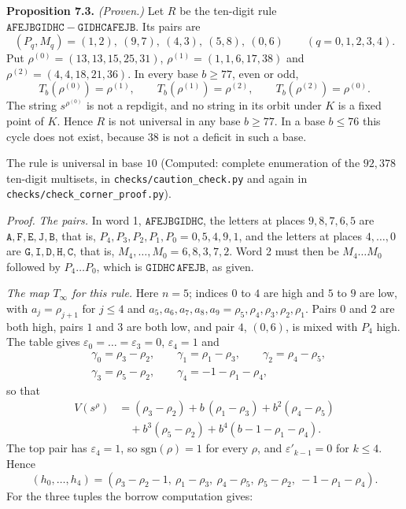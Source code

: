 \documentclass[11pt,letterpaper]{article}
\theoremstyle{paperstyle}
\theoremstyle{paperstyledef}
\theoremstyle{paperstylerem}
\begin{document}
\textbf{Proposition 7.3.} \emph{(Proven.)} Let \(R\) be the ten-digit rule \(\mathtt{AFEJBGIDHC} - \mathtt{GIDHCAFEJB}\). Its pairs are \[(P_q, M_q) = (1,2),\ (9,7),\ (4,3),\ (5,8),\ (0,6) \qquad (q = 0, 1, 2, 3, 4).\] Put \(\rho^{(0)} = (13,13,15,25,31)\), \(\rho^{(1)} = (1,1,6,17,38)\) and \(\rho^{(2)} = (4,4,18,21,36)\). In every base \(b \ge 77\), even or odd, \[T_b(\rho^{(0)}) = \rho^{(1)}, \qquad T_b(\rho^{(1)}) = \rho^{(2)}, \qquad T_b(\rho^{(2)}) = \rho^{(0)}.\] The string \(s^{\rho^{(0)}}\) is not a repdigit, and no string in its orbit under \(K\) is a fixed point of \(K\). Hence \(R\) is not universal in any base \(b \ge 77\). In a base \(b \le 76\) this cycle does not exist, because \(38\) is not a deficit in such a base.

The rule is universal in base \(10\) (Computed: complete enumeration of the \(92{,}378\) ten-digit multisets, in \texttt{checks/caution\_check.py} and again in \texttt{checks/check\_corner\_proof.py}).

\emph{Proof.} \emph{The pairs.} In word 1, \(\mathtt{AFEJBGIDHC}\), the letters at places \(9, 8, 7, 6, 5\) are \(\mathtt{A}, \mathtt{F}, \mathtt{E}, \mathtt{J}, \mathtt{B}\), that is, \(P_4, P_3, P_2, P_1, P_0 = 0, 5, 4, 9, 1\), and the letters at places \(4, \dots, 0\) are \(\mathtt{G}, \mathtt{I}, \mathtt{D}, \mathtt{H}, \mathtt{C}\), that is, \(M_4, \dots, M_0 = 6, 8, 3, 7, 2\). Word 2 must then be \(M_4 \dots M_0\) followed by \(P_4 \dots P_0\), which is \(\mathtt{GIDHC}\,\mathtt{AFEJB}\), as given.

\emph{The map \(T_\infty\) for this rule.} Here \(n = 5\); indices \(0\) to \(4\) are high and \(5\) to \(9\) are low, with \(a_j = \rho_{j+1}\) for \(j \le 4\) and \(a_5, a_6, a_7, a_8, a_9 = \rho_5, \rho_4, \rho_3, \rho_2, \rho_1\). Pairs \(0\) and \(2\) are both high, pairs \(1\) and \(3\) are both low, and pair \(4\), \((0, 6)\), is mixed with \(P_4\) high. The table gives \(\varepsilon_0 = \dots = \varepsilon_3 = 0\), \(\varepsilon_4 = 1\) and \[\begin{aligned}
&\gamma_0 = \rho_3 - \rho_2, \qquad \gamma_1 = \rho_1 - \rho_3, \qquad \gamma_2 = \rho_4 - \rho_5, \\
&\gamma_3 = \rho_5 - \rho_2, \qquad \gamma_4 = -1 - \rho_1 - \rho_4,
\end{aligned}\] so that \[\begin{aligned}
V(s^\rho) &= (\rho_3 - \rho_2) + b\,(\rho_1 - \rho_3) + b^2 (\rho_4 - \rho_5) \\
&\quad + b^3 (\rho_5 - \rho_2) + b^4 (b - 1 - \rho_1 - \rho_4).
\end{aligned}\] The top pair has \(\varepsilon_4 = 1\), so \(\mathrm{sgn}(\rho) = 1\) for every \(\rho\), and \(\varepsilon'_{k-1} = 0\) for \(k \le 4\). Hence \[(h_0, \dots, h_4) = (\rho_3 - \rho_2 - 1,\ \rho_1 - \rho_3,\ \rho_4 - \rho_5,\ \rho_5 - \rho_2,\ -1 - \rho_1 - \rho_4).\] For the three tuples the borrow computation gives:
\end{document}
